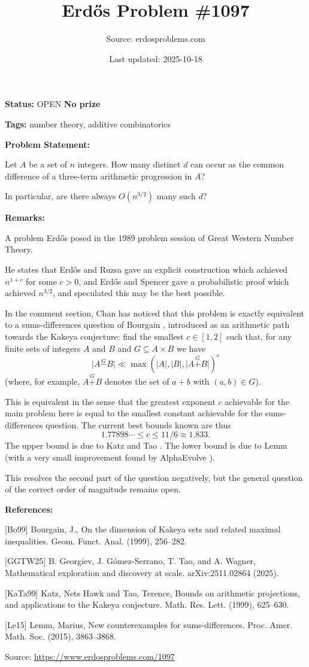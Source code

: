 \documentclass{article}
\title{Erd\H{o}s Problem \#1097}
\date{Last updated: 2025-10-18}
\author{Source: erdosproblems.com}
\begin{document}
\maketitle

\noindent\textbf{Status:} OPEN \quad \textbf{No prize}

\noindent\textbf{Tags:} number theory, additive combinatorics

\medskip
\noindent\textbf{Problem Statement:}

Let $A$ be a set of $n$ integers. How many distinct $d$ can occur as the common difference of a three-term arithmetic progression in $A$?

In particular, are there always $O(n^{3/2})$ many such $d$?

\bigskip
\noindent\textbf{Remarks:}

A problem Erd\H{o}s posed in the 1989 problem session of Great Western Number Theory.

He states that Erd\H{o}s and Ruzsa gave an explicit construction which achieved $n^{1+c}$ for some $c>0$, and Erd\H{o}s and Spencer gave a probabilistic proof which achieved $n^{3/2}$, and speculated this may be the best possible.

In the comment section, Chan has noticed that this problem is exactly equivalent to a sums-differences question of Bourgain \cite{Bo99}, introduced as an arithmetic path towards the Kakeya conjecture: find the smallest $c\in [1,2]$ such that, for any finite sets of integers $A$ and $B$ and $G\subseteq A\times B$ we have\[\lvert A\overset{G}{-}B\rvert \ll \max(\lvert A\rvert,\lvert B\rvert, \lvert A\overset{G}{+}B\rvert)^c\](where, for example, $A\overset{G}{+}B$ denotes the set of $a+b$ with $(a,b)\in G$). 

This is equivalent in the sense that the greatest exponent $c$ achievable for the main problem here is equal to the smallest constant achievable for the sums-differences question. The current best bounds known are thus\[1.77898\cdots \leq c \leq 11/6 \approx 1.833.\]The upper bound is due to Katz and Tao \cite{KaTa99}. The lower bound is due to Lemm \cite{Le15} (with a very small improvement found by AlphaEvolve \cite{GGTW25}). 

This resolves the second part of the question negatively, but the general question of the correct order of magnitude remains open.

\bigskip
\noindent\textbf{References:}

[Bo99] Bourgain, J., On the dimension of {K}akeya sets and related maximal
inequalities. Geom. Funct. Anal. (1999), 256--282.
 
 [GGTW25] B. Georgiev, J. G\'{o}mez-Serrano, T. Tao, and A. Wagner, Mathematical exploration and discovery at scale. arXiv:2511.02864 (2025).
 
 [KaTa99] Katz, Nets Hawk and Tao, Terence, Bounds on arithmetic projections, and applications to the
{K}akeya conjecture. Math. Res. Lett. (1999), 625--630.
 
 [Le15] Lemm, Marius, New counterexamples for sums-differences. Proc. Amer. Math. Soc. (2015), 3863--3868.

\bigskip
\noindent\small{Source: \url{https://www.erdosproblems.com/1097}}
\end{document}
